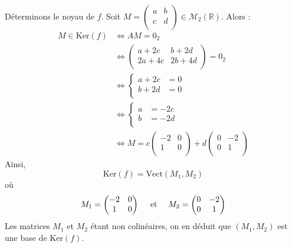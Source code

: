 \documentclass[a4paper,10pt]{report}
\begin{document}
\begin{enumerate}
\noindent Déterminons le noyau de $f$. Soit $M = \begin{pmatrix}
a&b \\
c & d \\
\end{pmatrix} \in \mathcal{M}_2(\mathbb{R})$. Alors :
\begin{align*}
M \in \textrm{Ker}(f) & \Longleftrightarrow  AM = 0_2 \\
& \Longleftrightarrow \begin{pmatrix}
a+2c & b+2d \\
2a+4c & 2b+4d \\
\end{pmatrix} = 0_2 \\
& \Longleftrightarrow \left\lbrace \begin{array}{cl}
a+2c & = 0 \\
b+2d & = 0 \\
\end{array}\right. \\
& \Longleftrightarrow \left\lbrace \begin{array}{cl}
a& = -2c \\
b & = -2d \\
\end{array}\right. \\
& \Longleftrightarrow  M = c \begin{pmatrix}
-2 & 0 \\
1 & 0 \\
\end{pmatrix} + d \begin{pmatrix}
0 & -2 \\
0 & 1 \\
\end{pmatrix}
\end{align*}
Ainsi,
$$ \textrm{Ker}(f) = \textrm{Vect}(M_1,M_2)$$
où
$$ M_1 = \begin{pmatrix}
-2 & 0 \\
1 & 0 \\
\end{pmatrix} \quad \hbox{ et } \quad M_2 = \begin{pmatrix}
0 & -2 \\
0 & 1 \\
\end{pmatrix}$$
Les matrices $M_1$ et $M_2$ étant non colinéaires, on en déduit que $(M_1,M_2)$ est une base de $\textrm{Ker}(f)$.

\medskip


\end{enumerate}
\end{document}
